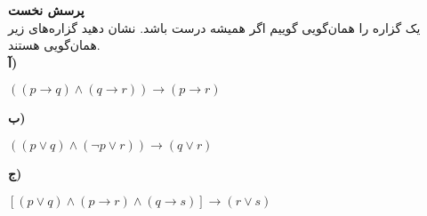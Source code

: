 \textbf{پرسش نخست}\\[0.1in]
یک گزاره را همان‌گويی گوييم اگر هميشه درست باشد. نشان دهيد گزاره‌های زير همان‌گويی هستند.
\\[0.1in]
\textbf{آ)}
\begin{center}
    $((p \rightarrow q) \wedge (q \rightarrow r))
    \rightarrow (p \rightarrow r)$    
\end{center}
\textbf{ب)}
\begin{center}
    $((p \vee q) \wedge (\neg p \vee r)) \rightarrow
     (q \vee r)$
\end{center}
\textbf{ج)}
\begin{center}
    $[ (p \vee q) \wedge (p \rightarrow r) \wedge
    (q \rightarrow s)] \rightarrow (r \vee s)$
\end{center}
